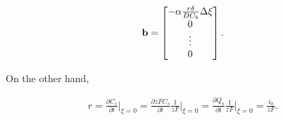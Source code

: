 \begin{align}
    \bf{b} = \begin{bmatrix}
                -\alpha\frac{r\delta}{DC_b} \Delta \xi\\
                0\\
                \vdots \\
                0
                \end{bmatrix}.
\end{align}

On the other hand,

\begin{align}
r = \frac{\partial C_s}{\partial t}\bigg|_{\xi = 0} = \frac{\partial zF C_s}{\partial t}\frac{1}{zF}\bigg|_{\xi = 0} = \frac{\partial Q_s}{\partial t}\frac{1}{zF}\bigg|_{\xi = 0} =  \frac{i_0}{zF}.
\end{align}


